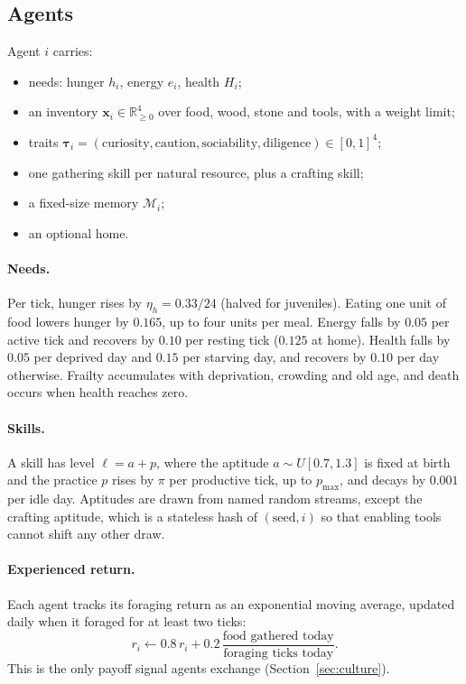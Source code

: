 \documentclass[11pt]{article}
\theoremstyle{definition}
\newcommand{\1}{\mathbf{1}}
\begin{document}
\subsection{Agents}
Agent $i$ carries:
\begin{itemize}
\item needs: hunger $h_i$, energy $e_i$, health $H_i$;
\item an inventory $\mathbf{x}_i\in\mathbb{R}^4_{\ge0}$ over food, wood, stone and tools, with a weight limit;
\item traits $\boldsymbol{\tau}_i=(\text{curiosity},\text{caution},\text{sociability},\text{diligence})\in[0,1]^4$;
\item one gathering skill per natural resource, plus a crafting skill;
\item a fixed-size memory $\mathcal{M}_i$;
\item an optional home.
\end{itemize}

\paragraph{Needs.} Per tick, hunger rises by $\eta_h = 0.33/24$ (halved for juveniles). Eating one unit of food lowers hunger by $0.165$, up to four units per meal. Energy falls by $0.05$ per active tick and recovers by $0.10$ per resting tick ($0.125$ at home). Health falls by $0.05$ per deprived day and $0.15$ per starving day, and recovers by $0.10$ per day otherwise. Frailty accumulates with deprivation, crowding and old age, and death occurs when health reaches zero.

\paragraph{Skills.} A skill has level $\ell = a + p$, where the aptitude $a\sim U[0.7,1.3]$ is fixed at birth and the practice $p$ rises by $\pi$ per productive tick, up to $p_{\max}$, and decays by $0.001$ per idle day. Aptitudes are drawn from named random streams, except the crafting aptitude, which is a stateless hash of $(\text{seed},i)$ so that enabling tools cannot shift any other draw.

\paragraph{Experienced return.} Each agent tracks its foraging return as an exponential moving average, updated daily when it foraged for at least two ticks:
\begin{equation}
r_i \leftarrow 0.8\,r_i + 0.2\,\frac{\text{food gathered today}}{\text{foraging ticks today}}.
\label{eq:return}
\end{equation}
This is the only payoff signal agents exchange (Section~\ref{sec:culture}).
\end{document}
